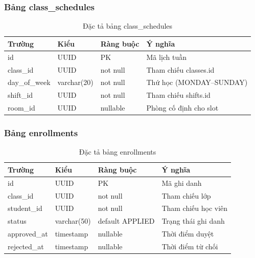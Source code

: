 \documentclass[../DoAn.tex]{subfiles}
\begin{document}
\subsubsection{Bảng class\_schedules}
\begin{table}[H]
\centering
\caption{Đặc tả bảng class\_schedules}
\scriptsize
\begin{tabular}{|l|l|l|p{4cm}|}
\hline
\textbf{Trường} & \textbf{Kiểu} & \textbf{Ràng buộc} & \textbf{Ý nghĩa} \\ \hline
id & UUID & PK & Mã lịch tuần \\ \hline
class\_id & UUID & not null & Tham chiếu classes.id \\ \hline
day\_of\_week & varchar(20) & not null & Thứ học (MONDAY--SUNDAY) \\ \hline
shift\_id & UUID & not null & Tham chiếu shifts.id \\ \hline
room\_id & UUID & nullable & Phòng cố định cho slot \\ \hline
\end{tabular}
\end{table}

\subsubsection{Bảng enrollments}
\begin{table}[H]
\centering
\caption{Đặc tả bảng enrollments}
\scriptsize
\begin{tabular}{|l|l|l|p{4cm}|}
\hline
\textbf{Trường} & \textbf{Kiểu} & \textbf{Ràng buộc} & \textbf{Ý nghĩa} \\ \hline
id & UUID & PK & Mã ghi danh \\ \hline
class\_id & UUID & not null & Tham chiếu lớp \\ \hline
student\_id & UUID & not null & Tham chiếu học viên \\ \hline
status & varchar(50) & default APPLIED & Trạng thái ghi danh \\ \hline
approved\_at & timestamp & nullable & Thời điểm duyệt \\ \hline
rejected\_at & timestamp & nullable & Thời điểm từ chối \\ \hline
\end{tabular}
\end{table}
\end{document}
